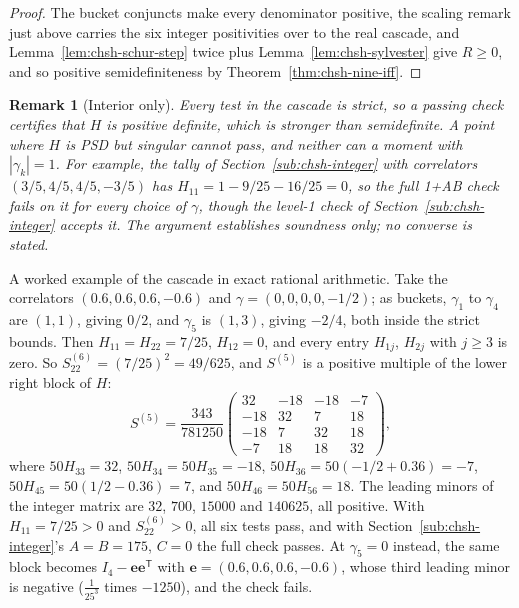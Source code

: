 \documentclass[11pt,twoside]{article}
\theoremstyle{thielethm}
\theoremstyle{thieledef}
\theoremstyle{thieledef}
\newtheorem{remark}{Remark}[section]
\theoremstyle{thieledef}
\theoremstyle{thielethm}
\theoremstyle{thieleobs}
\theoremstyle{thielethm}
\begin{document}
\begin{proof}
The bucket conjuncts make every denominator positive, the scaling remark just above carries the
six integer positivities over to the real cascade, and Lemma~\ref{lem:chsh-schur-step} twice plus
Lemma~\ref{lem:chsh-sylvester} give $R \ge 0$, and so positive semidefiniteness by Theorem~\ref{thm:chsh-nine-iff}.
\end{proof}

\begin{remark}[Interior only]\label{rem:chsh-interior}
Every test in the cascade is strict, so a passing check certifies that $H$ is positive
definite, which is stronger than semidefinite. A point where $H$ is PSD but singular cannot pass, and
neither can a moment with $|\gamma_k| = 1$. For example, the tally of Section~\ref{sub:chsh-integer} with correlators
$(3/5, 4/5, 4/5, -3/5)$ has $H_{11} = 1 - 9/25 - 16/25 = 0$, so the full 1+AB check fails on it
for every choice of $\gamma$, though the level-1 check of Section~\ref{sub:chsh-integer} accepts it. The argument establishes soundness only; no converse is stated.
\end{remark}

A worked example of the cascade in exact rational arithmetic. Take the correlators $(0.6, 0.6, 0.6, -0.6)$ and
$\gamma = (0, 0, 0, 0, -1/2)$; as buckets, $\gamma_1$ to $\gamma_4$ are $(1,1)$, giving
$0/2$, and $\gamma_5$ is $(1,3)$, giving $-2/4$, both inside the strict bounds. Then
$H_{11} = H_{22} = 7/25$, $H_{12} = 0$, and every entry $H_{1j}$, $H_{2j}$ with $j \ge 3$ is
zero. So $S^{(6)}_{22} = (7/25)^2 = 49/625$, and $S^{(5)}$ is a positive multiple of the lower
right block of $H$:
\[
S^{(5)} = \frac{343}{781250}
\begin{pmatrix}
32 & -18 & -18 & -7 \\
-18 & 32 & 7 & 18 \\
-18 & 7 & 32 & 18 \\
-7 & 18 & 18 & 32
\end{pmatrix},
\]
where $50 H_{33} = 32$, $50 H_{34} = 50 H_{35} = -18$, $50 H_{36} = 50(-1/2 + 0.36) = -7$,
$50 H_{45} = 50(1/2 - 0.36) = 7$, and $50 H_{46} = 50 H_{56} = 18$. The leading minors of the
integer matrix are $32$, $700$, $15000$ and $140625$, all positive. With
$H_{11} = 7/25 > 0$ and $S^{(6)}_{22} > 0$, all six tests pass, and with Section~\ref{sub:chsh-integer}'s $A = B = 175$,
$C = 0$ the full check passes. At $\gamma_5 = 0$ instead, the same block becomes
$I_4 - \mathbf e \mathbf e^{\mathsf T}$ with $\mathbf e = (0.6, 0.6, 0.6, -0.6)$, whose third
leading minor is negative ($\tfrac{1}{25^3}$ times $-1250$), and the check fails.
\end{document}
